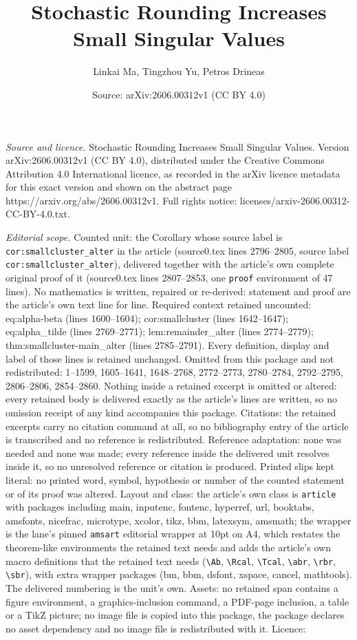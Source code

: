 \documentclass[10pt,a4paper]{amsart}
\title[Stochastic Rounding Increases Small Singular Values]{Stochastic Rounding Increases Small Singular Values}
\author{Linkai Ma, Tingzhou Yu, Petros Drineas}
\date{Source: arXiv:2606.00312v1 (CC BY 4.0)}
\begin{document}
\maketitle

\noindent\emph{Source and licence.} Stochastic Rounding Increases Small Singular Values. Version arXiv:2606.00312v1 (CC BY 4.0), distributed under the Creative Commons Attribution 4.0 International licence, as recorded in the arXiv licence metadata for this exact version and shown on the abstract page https://arxiv.org/abs/2606.00312v1. Full rights notice: licenses/arxiv-2606.00312-CC-BY-4.0.txt.\par\smallskip

\noindent\textit{Editorial scope.} Counted unit: the Corollary whose source label is \texttt{cor:smallcluster\_alter} in the article (source0.tex lines 2796--2805, source label \texttt{cor:smallcluster\_alter}), delivered together with the article's own complete original proof of it (source0.tex lines 2807--2853, one \texttt{proof} environment of 47 lines). No mathematics is written, repaired or re-derived: statement and proof are the article's own text line for line. Required context retained uncounted: eq:alpha-beta (lines 1600--1604); cor:smallcluster (lines 1642--1647); eq:alpha\_tilde (lines 2769--2771); lem:remainder\_alter (lines 2774--2779); thm:smallcluster-main\_alter (lines 2785--2791). Every definition, display and label of those lines is retained unchanged. Omitted from this package and not redistributed: 1--1599, 1605--1641, 1648--2768, 2772--2773, 2780--2784, 2792--2795, 2806--2806, 2854--2860. Nothing inside a retained excerpt is omitted or altered: every retained body is delivered exactly as the article's lines are written, so no omission receipt of any kind accompanies this package. Citations: the retained excerpts carry no citation command at all, so no bibliography entry of the article is transcribed and no reference is redistributed. Reference adaptation: none was needed and none was made; every reference inside the delivered unit resolves inside it, so no unresolved reference or citation is produced. Printed slips kept literal: no printed word, symbol, hypothesis or number of the counted statement or of its proof was altered. Layout and class: the article's own class is \texttt{article} with packages including main, inputenc, fontenc, hyperref, url, booktabs, amsfonts, nicefrac, microtype, xcolor, tikz, bbm, latexsym, amsmath; the wrapper is the lane's pinned \texttt{amsart} editorial wrapper at 10pt on A4, which restates the theorem-like environments the retained text needs and adds the article's own macro definitions that the retained text needs (\texttt{\textbackslash Ab}, \texttt{\textbackslash Rcal}, \texttt{\textbackslash Tcal}, \texttt{\textbackslash abr}, \texttt{\textbackslash rbr}, \texttt{\textbackslash sbr}), with extra wrapper packages (bm, bbm, dsfont, xspace, cancel, mathtools). The delivered numbering is the unit's own. Assets: no retained span contains a figure environment, a graphics-inclusion command, a PDF-page inclusion, a table or a TikZ picture; no image file is copied into this package, the package declares no asset dependency and no image file is redistributed with it. Licence: 
\end{document}
